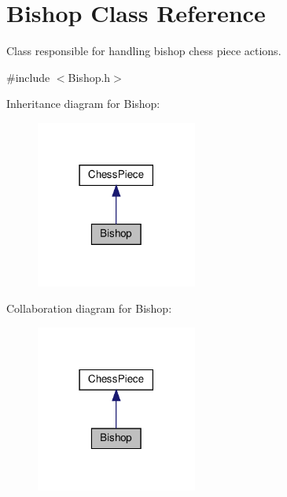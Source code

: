 \hypertarget{classBishop}{}\section{Bishop Class Reference}
\label{classBishop}


Class responsible for handling bishop chess piece actions.  




{\ttfamily \#include $<$Bishop.\+h$>$}



Inheritance diagram for Bishop\+:\nopagebreak
\begin{figure}[H]
\begin{center}
\leavevmode
\includegraphics[width=150pt]{classBishop__inherit__graph}
\end{center}
\end{figure}


Collaboration diagram for Bishop\+:\nopagebreak
\begin{figure}[H]
\begin{center}
\leavevmode
\includegraphics[width=150pt]{classBishop__coll__graph}
\end{center}
\end{figure}
